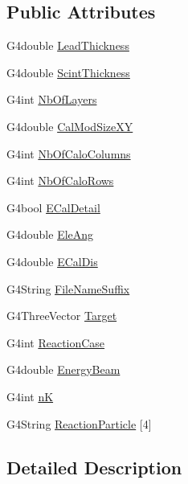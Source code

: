 \subsection*{Public Attributes}
\begin{DoxyCompactItemize}
\item 
G4double \hyperlink{class_s_b_s_variables_ac18998a9e16bed4d4737bd3fdbe3032e}{Lead\-Thickness}
\item 
G4double \hyperlink{class_s_b_s_variables_abb259dd81111497ec4db2fe9199f2d01}{Scint\-Thickness}
\item 
G4int \hyperlink{class_s_b_s_variables_adec94678029bfd057c6ba3daabe6f5a3}{Nb\-Of\-Layers}
\item 
G4double \hyperlink{class_s_b_s_variables_a92e4bb3f201e0cff282ca71215348156}{Cal\-Mod\-Size\-X\-Y}
\item 
G4int \hyperlink{class_s_b_s_variables_adc90201ebd65e3b3366b1b6f4dff5ebf}{Nb\-Of\-Calo\-Columns}
\item 
G4int \hyperlink{class_s_b_s_variables_acf7deca6d17faac95752ce05c0c49d55}{Nb\-Of\-Calo\-Rows}
\item 
G4bool \hyperlink{class_s_b_s_variables_a370739e528c9193ac1da6d4fed91c882}{E\-Cal\-Detail}
\item 
G4double \hyperlink{class_s_b_s_variables_a3286bfb8c9f691a7315a5c97c7ea1adc}{Ele\-Ang}
\item 
G4double \hyperlink{class_s_b_s_variables_ad7c0c85364e09e7dc5f7d687bf7fbbf4}{E\-Cal\-Dis}
\item 
G4\-String \hyperlink{class_s_b_s_variables_a47b76d8c38f66e49d9b321ef066b28e9}{File\-Name\-Suffix}
\item 
G4\-Three\-Vector \hyperlink{class_s_b_s_variables_a3c76a8b893d04a78ff94f46cc80a7932}{Target}
\item 
G4int \hyperlink{class_s_b_s_variables_ab416f097e1de50c1bbc462d5908f6b5d}{Reaction\-Case}
\item 
G4double \hyperlink{class_s_b_s_variables_a690e4d01c59328ad6ac6f53a9b6cc3e7}{Energy\-Beam}
\item 
G4int \hyperlink{class_s_b_s_variables_af10311ab957c982d3916c1d838162786}{n\-K}
\item 
G4\-String \hyperlink{class_s_b_s_variables_a0920a3979aa1c25c139d6a0f13669b00}{Reaction\-Particle} \mbox{[}4\mbox{]}
\end{DoxyCompactItemize}


\subsection{Detailed Description}


